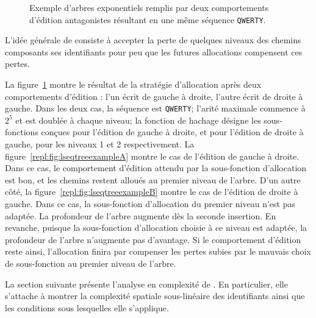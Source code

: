 \begin{figure}
  \begin{center}
    \caption[Gestion des comportements d'édition par \LSEQ]
    {\label{repl:fig:lseqtreeexample} Exemple d'arbres exponentiels \LSEQ
      remplis par deux comportements d'édition antagonistes résultant en une
      même séquence \texttt{QWERTY}.}
  \end{center}
\end{figure}

L'idée générale de \LSEQ consiste à accepter la perte de quelques niveaux des
chemins composants ses identifiants pour peu que les futures allocations
compensent ces pertes.


La figure~\ref{repl:fig:lseqtreeexample} montre le résultat de la stratégie
d'allocation \LSEQ après deux comportements d'édition : l'un écrit de gauche à
droite, l'autre écrit de droite à gauche. Dans les deux cas, la séquence est
\texttt{QWERTY}; l'arité maximale commence à $2^5$ et est doublée à chaque
niveau; la fonction de hachage désigne les sous-fonctions conçues pour l'édition
de gauche à droite, et pour l'édition de droite à gauche, pour les niveaux 1 et
2 respectivement. La figure~\ref{repl:fig:lseqtreeexampleA} montre le cas de
l'édition de gauche à droite. Dans ce cas, le comportement d'édition attendu par
la sous-fonction d'allocation est bon, et les chemins restent alloués au premier
niveau de l'arbre. D'un autre côté, la figure~\ref{repl:fig:lseqtreeexampleB}
montre le cas de l'édition de droite à gauche. Dans ce cas, la sous-fonction
d'allocation du premier niveau n'est pas adaptée. La profondeur de l'arbre
augmente dès la seconde insertion. En revanche, puisque la sous-fonction
d'allocation choisie à ce niveau est adaptée, la profondeur de l'arbre
n'augmente pas d'avantage. Si le comportement d'édition reste ainsi,
l'allocation finira par compenser les pertes subies par le mauvais choix de
sous-fonction au premier niveau de l'arbre.

La section suivante présente l'analyse en complexité de \LSEQ. En particulier,
elle s'attache à montrer la complexité spatiale sous-linéaire des identifiants
ainsi que les conditions sous lesquelles elle s'applique.

